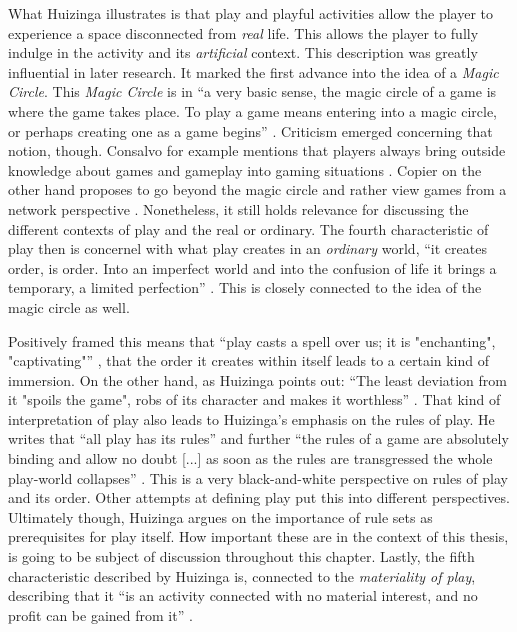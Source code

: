 What Huizinga illustrates is that play and playful activities allow the player to experience a space disconnected from \textit{real} life. This allows the player to fully indulge in the activity and its \textit{artificial} context. This description was greatly influential in later research. It marked the first advance into the idea of a \textit{Magic Circle}. This \textit{Magic Circle} is in \enquote{a very basic sense, the magic circle of a game is where the game takes place. To play a game means entering into a magic circle, or perhaps creating one as a game begins} \cite[p. 95]{salen2004rules}. Criticism emerged concerning that notion, though. Consalvo for example mentions that players always bring outside knowledge about games and gameplay into gaming situations \cite[p. 415]{consalvo2009there}. Copier on the other hand proposes to go beyond the magic circle and rather view games from a network perspective \cite[p. 11]{copier2007beyond}. Nonetheless, it still holds relevance for discussing the different contexts of play and the real or ordinary. The fourth characteristic of play then is concernel with what play creates in an \textit{ordinary} world, \enquote{it creates order, is order. Into an imperfect world and into the confusion of life it brings a temporary, a limited perfection} \cite[p. 10]{huizinga2020homo}. This is closely connected to the idea of the magic circle as well.

Positively framed this means that \enquote{play casts a spell over us; it is "enchanting", "captivating"} \cite[p. 10]{huizinga2020homo}, that the order it creates within itself leads to a certain kind of immersion. On the other hand, as Huizinga points out: \enquote{The least deviation from it "spoils the game", robs of its character and makes it worthless} \cite[p. 10]{huizinga2020homo}. That kind of interpretation of play also leads to Huizinga's emphasis on the rules of play. He writes that \enquote{all play has its rules} and further \enquote{the rules of a game are absolutely binding and allow no doubt [...] as soon as the rules are transgressed the whole play-world collapses} \cite[p. 11]{huizinga2020homo}. This is a very black-and-white perspective on rules of play and its order. Other attempts at defining play put this into different perspectives. Ultimately though, Huizinga argues on the importance of rule sets as prerequisites for play itself. How important these are in the context of this thesis, is going to be subject of discussion throughout this chapter. Lastly, the fifth characteristic described by Huizinga is, connected to the \textit{materiality of play}, describing that it \enquote{is an activity connected with no material interest, and no profit can be gained from it} \cite[p. 13]{huizinga2020homo}.

